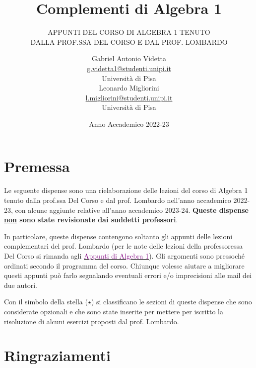 \documentclass[11pt]{scrartcl}
\begin{document}
	\title{Complementi di Algebra 1}
	\subtitle{\large\normalfont\rmfamily\scshape APPUNTI DEL CORSO DI ALGEBRA 1 TENUTO\\ DALLA PROF.SSA DEL CORSO E DAL PROF. LOMBARDO}
	\author{Gabriel Antonio Videtta \\ \textnormal{\href{g.videtta1@studenti.unipi.it}{g.videtta1@studenti.unipi.it}} \\ Università di Pisa \\[0.3in] Leonardo Migliorini \\ \textnormal{\href{l.migliorini@studenti.unipi.it}{l.migliorini@studenti.unipi.it}} \\ Università di Pisa}
	\date{Anno Accademico 2022-23}
	\maketitle
	\newpage
	
	\tableofcontents
	
	\newpage
	
	\section*{Premessa}
	Le seguente dispense sono una rielaborazione delle lezioni del corso di Algebra 1 tenuto dalla prof.ssa Del Corso e dal prof. Lombardo nell'anno accademico 
	2022-23, con alcune aggiunte relative all'anno accademico 2023-24. \textbf{Queste dispense \underline{non} sono state revisionate dai suddetti professori}. \medskip
	
	In particolare, queste dispense contengono soltanto gli appunti delle lezioni complementari del prof. Lombardo (per
	le note delle lezioni della professoressa Del Corso si rimanda agli \href{https://github.com/diego-unipi/Algebra-1}{\textcolor{purple}{Appunti di Algebra 1}}). Gli argomenti sono pressoché ordinati secondo il programma del corso.
	Chiunque volesse aiutare a migliorare questi appunti può farlo segnalando eventuali errori e/o imprecisioni alle mail dei due autori. \medskip
	
	Con il simbolo della stella ($\star$) si classificano le sezioni di queste dispense che
	sono considerate opzionali e che sono state inserite per mettere per iscritto la
	risoluzione di alcuni esercizi proposti dal prof. Lombardo.
	
	\section*{Ringraziamenti}
	
\end{document}
